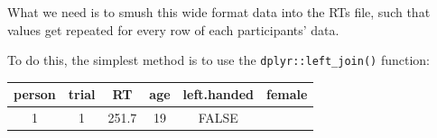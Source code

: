 \documentclass[]{article}
\newenvironment{Shaded}{\begin{snugshade}}{\end{snugshade}}
\newcommand{\KeywordTok}[1]{\textcolor[rgb]{0.13,0.29,0.53}{\textbf{#1}}}
\newcommand{\DataTypeTok}[1]{\textcolor[rgb]{0.13,0.29,0.53}{#1}}
\newcommand{\StringTok}[1]{\textcolor[rgb]{0.31,0.60,0.02}{#1}}
\newcommand{\OperatorTok}[1]{\textcolor[rgb]{0.81,0.36,0.00}{\textbf{#1}}}
\newcommand{\NormalTok}[1]{#1}
\theoremstyle{definition}
\theoremstyle{definition}
\theoremstyle{definition}
\theoremstyle{remark}
\begin{document}
What we need is to smush this wide format data into the RTs file, such
that values get repeated for every row of each participants' data.

To do this, the simplest method is to use the
\texttt{dplyr::left\_join()} function:

\begin{Shaded}
\end{Shaded}

\begin{longtable}[]{@{}cccccc@{}}
\toprule
\begin{minipage}[b]{0.10\columnwidth}\centering\strut
person\strut
\end{minipage} & \begin{minipage}[b]{0.09\columnwidth}\centering\strut
trial\strut
\end{minipage} & \begin{minipage}[b]{0.09\columnwidth}\centering\strut
RT\strut
\end{minipage} & \begin{minipage}[b]{0.07\columnwidth}\centering\strut
age\strut
\end{minipage} & \begin{minipage}[b]{0.16\columnwidth}\centering\strut
left.handed\strut
\end{minipage} & \begin{minipage}[b]{0.09\columnwidth}\centering\strut
female\strut
\end{minipage}\tabularnewline
\midrule
\endhead
\begin{minipage}[t]{0.10\columnwidth}\centering\strut
1\strut
\end{minipage} & \begin{minipage}[t]{0.09\columnwidth}\centering\strut
1\strut
\end{minipage} & \begin{minipage}[t]{0.09\columnwidth}\centering\strut
251.7\strut
\end{minipage} & \begin{minipage}[t]{0.07\columnwidth}\centering\strut
19\strut
\end{minipage} & \begin{minipage}[t]{0.16\columnwidth}\centering\strut
FALSE\strut
\end{minipage} & \begin{minipage}[t]{0.09\columnwidth}\centering\strut

\end{minipage}
\end{longtable}
\end{document}
